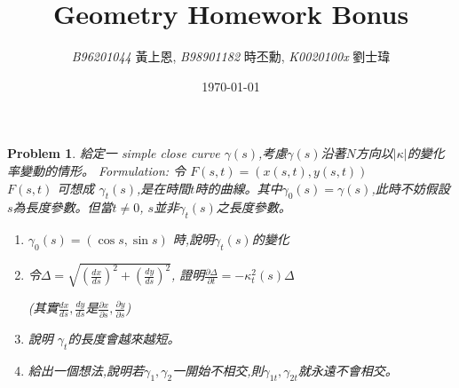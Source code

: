 \documentclass[10pt,a4paper]{article}
\newcommand{\LiHei}{\CJKfamily{lh}}
\newcounter{theProblemCounter}
\newtheorem{problem}[theProblemCounter]{Problem}
\begin{document}
\title{{Geometry Homework Bonus}}
\author{{\it{B96201044}} {\LiHei 黃上恩}, {\it{B98901182}} {\LiHei 時丕勳}, {\it{K0020100x}} {\LiHei 劉士瑋}}
\date{\today}
\maketitle

\newcommand{\bx}{\mathbb{X}}
\newcommand{\bfx}{\mathbf{x}}
\newcommand{\grad}{\textrm{grad }}
\newcommand{\sech}{\mbox{sech}}
\newcommand{\pr}[2]{\frac{\partial #1}{\partial #2}}
\newcommand{\prr}[3]{\frac{\partial^2 #1}{\partial #2\partial #3}}
\newcommand{\ip}[2]{\langle#1, #2\rangle}

\begin{problem}
給定一 simple close curve $\gamma(s)$,考慮$\gamma(s)$沿著$N$方向以$|\kappa|$的變化率變動的情形。 Formulation: 令 $F(s, t) = (x(s, t), y(s, t))$\\ $F(s,t)$ 可想成 $\gamma_t(s)$,是在時間$t$時的曲線。其中$\gamma_0(s) = \gamma(s)$,此時不妨假設$s$為長度參數。但當$t \neq 0$, $s$並非$\gamma_t(s)$之長度參數。\begin{enumerate}
\item $\gamma_0(s) = (\cos s, \sin s)$ 時,說明$\gamma_t(s)$的變化
\item 令$\Delta=\sqrt{\left(\frac{dx}{ds}\right)^2 + \left(\frac{dy}{ds}\right)^2}$, 證明$\frac{\partial\Delta}{\partial t}=-\kappa_t^2(s)\Delta$ \par
(其實$\frac{dx}{ds}, \frac{dy}{ds}$是$\frac{\partial x}{\partial s}, \frac{\partial y}{\partial s}$)
\item 說明 $\gamma_t$的長度會越來越短。
\item 給出一個想法,說明若$\gamma_1, \gamma_2$一開始不相交,則$\gamma_{1t}, \gamma_{2t}$就永遠不會相交。
\end{enumerate}
\end{problem}
\end{document}
